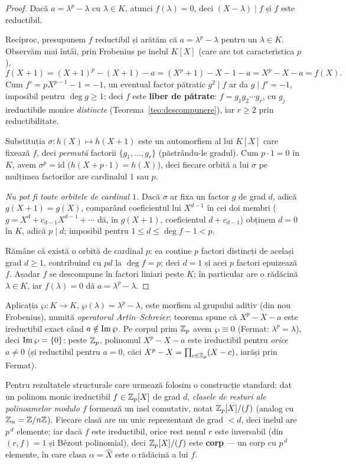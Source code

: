 \begin{proof}
Dacă $a=\lambda^p-\lambda$ cu $\lambda\in K$, atunci $f(\lambda)=0$, deci $(X-\lambda)\mid f$ și $f$ este reductibil.

Reciproc, presupunem $f$ reductibil și arătăm că $a=\lambda^p-\lambda$ pentru un $\lambda\in K$. Observăm mai întâi, prin Frobenius pe inelul $K[X]$ (care are tot caracteristica $p$),
\[
f(X+1)=(X+1)^p-(X+1)-a=(X^p+1)-X-1-a=X^p-X-a=f(X).
\]
Cum $f'=pX^{p-1}-1=-1$, un eventual factor pătratic $g^2\mid f$ ar da $g\mid f'=-1$, imposibil pentru $\deg g\ge1$; deci $f$ este \textbf{liber de pătrate}: $f=g_1g_2\cdots g_r$, cu $g_j$ ireductibile monice \emph{distincte} (Teorema~\ref{teo:descompunere}), iar $r\ge2$ prin reductibilitate.

Substituția $\sigma:h(X)\mapsto h(X+1)$ este un automorfism al lui $K[X]$ care fixează $f$, deci \emph{permută} factorii $\{g_1,\dots,g_r\}$ (păstrându-le gradul). Cum $p\cdot1=0$ în $K$, avem $\sigma^p=\mathrm{id}$ ($h(X+p\cdot1)=h(X)$), deci fiecare orbită a lui $\sigma$ pe mulțimea factorilor are cardinalul $1$ sau $p$.

\emph{Nu pot fi toate orbitele de cardinal $1$.} Dacă $\sigma$ ar fixa un factor $g$ de grad $d$, adică $g(X+1)=g(X)$, comparând coeficientul lui $X^{d-1}$ în cei doi membri ($g=X^d+c_{d-1}X^{d-1}+\cdots$ dă, în $g(X+1)$, coeficientul $d+c_{d-1}$) obținem $d=0$ în $K$, adică $p\mid d$; imposibil pentru $1\le d\le\deg f-1<p$.

Rămâne că există o orbită de cardinal $p$: ea conține $p$ factori distincți de același grad $d\ge1$, contribuind cu $pd$ la $\deg f=p$; deci $d=1$ și acei $p$ factori epuizează $f$. Așadar $f$ se descompune în factori liniari peste $K$; în particular are o rădăcină $\lambda\in K$, iar $f(\lambda)=0$ dă $a=\lambda^p-\lambda$.
\end{proof}

\begin{observatie}
Aplicația $\wp:K\to K$, $\wp(\lambda)=\lambda^p-\lambda$, este morfism al grupului aditiv (din nou Frobenius), numită \emph{operatorul Artin--Schreier}; teorema spune că $X^p-X-a$ este ireductibil exact când $a\notin\operatorname{Im}\wp$. Pe corpul prim $\mathbb{Z}_p$ avem $\wp\equiv0$ (Fermat: $\lambda^p=\lambda$), deci $\operatorname{Im}\wp=\{0\}$: peste $\mathbb{Z}_p$, polinomul $X^p-X-a$ este ireductibil pentru \emph{orice} $a\neq0$ (și reductibil pentru $a=0$, căci $X^p-X=\prod_{c\in\mathbb{Z}_p}(X-c)$, iarăși prin Fermat).
\end{observatie}

Pentru rezultatele structurale care urmează folosim o construcție standard: dat un polinom monic ireductibil $f\in\mathbb{Z}_p[X]$ de grad $d$, \emph{clasele de resturi ale polinoamelor modulo $f$} formează un inel comutativ, notat $\mathbb{Z}_p[X]/(f)$ (analog cu $\mathbb{Z}_n=\mathbb{Z}/n\mathbb{Z}$). Fiecare clasă are un unic reprezentant de grad $<d$, deci inelul are $p^{\,d}$ elemente; iar dacă $f$ este ireductibil, orice rest nenul $r$ este inversabil (din $(r,f)=1$ și Bézout polinomial), deci $\mathbb{Z}_p[X]/(f)$ este \textbf{corp} --- un corp cu $p^{\,d}$ elemente, în care clasa $\alpha=\widehat X$ este o rădăcină a lui $f$.

